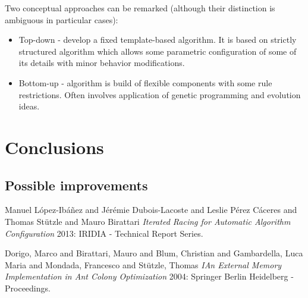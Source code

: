 \documentclass[12pt]{article}
\begin{document}
Two conceptual approaches can be remarked (although their distinction is ambiguous in particular cases):
\begin{itemize}
\item Top-down - develop a fixed template-based algorithm. It is based on strictly structured algorithm which allows some parametric configuration of some of its details with minor behavior modifications.
\item Bottom-up - algorithm is build of flexible components with some rule restrictions. Often involves application of genetic programming and evolution ideas.
\end{itemize}

\section{Conclusions}


\subsection{Possible improvements}



\begin{thebibliography}{1}


 Manuel L{\'o}pez-Ib{\'a}{\~n}ez  and  J{\'e}r{\'e}mie Dubois-Lacoste  and Leslie {P{\'e}rez C{\'a}ceres}  and  Thomas St{\"u}tzle  and  Mauro Birattari {\em Iterated Racing for Automatic Algorithm Configuration} 2013: IRIDIA - Technical Report Series.
  
 Dorigo, Marco
and Birattari, Mauro
and Blum, Christian
and Gambardella, Luca Maria
and Mondada, Francesco
and St{\"u}tzle, Thomas {\em IAn External Memory Implementation in Ant Colony Optimization} 2004: Springer Berlin Heidelberg - Proceedings.

\end{thebibliography}
\end{document}
